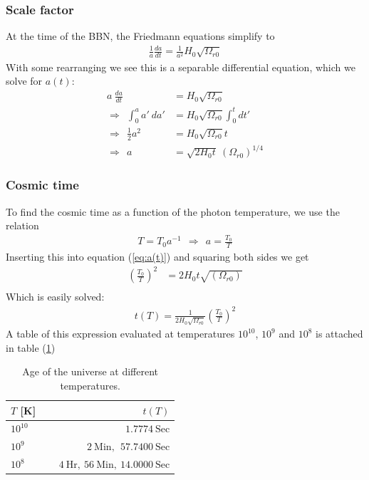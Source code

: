 \documentclass[reprint,english,notitlepage]{revtex4-1}  %
\numberwithin{equation}{section}
\begin{document}
\subsubsection{Scale factor}
At the time of the BBN, the Friedmann equations simplify to
\begin{align}
	\frac{1}{a} \frac{da}{dt} = \frac{1}{a^2}H_0 \sqrt{\Omega_{r0}}
\end{align}
With some rearranging we see this is a separable differential equation, which
we solve for $a(t)$:
\begin{align}
					 			 a\ \frac{da}{dt} &= H_0 \sqrt{\Omega_{r0}}\ \\
	\Rightarrow\ \ \int_0^a a'\ da' &= H_0 \sqrt{\Omega_{r0}} \int_0^t dt' \\
	\Rightarrow\ \   \frac{1}{2}a^2 &= H_0\sqrt{\Omega_{r0}}t \\
	\Rightarrow\ \ 	  				    a &= \sqrt{2 H_0 t}\  \left(\Omega_{r0}\right)^{1/4}
	\label{eq:a(t)}
\end{align}

\subsubsection{Cosmic time}
To find the cosmic time as a function of the photon temperature, we use the
relation
\begin{align}
	T = T_0 a^{-1} \ \ \Rightarrow \ \ a = \frac{T_0}{T}
\end{align}
Inserting this into equation (\ref{eq:a(t)}) and squaring both sides we get
\begin{align}
	\left(\frac{T_0}{T}\right)^2 &= 2 H_0 t \sqrt{(\Omega_{r0})} \\
\end{align}
Which is easily solved:
\begin{align}
	t(T) = \frac{1}{2 H_0 \sqrt{\Omega_{r0}}} \left(\frac{T_0}{T}\right)^2
\end{align}
A table of this expression evaluated at temperatures $10^{10}$, $10^9$ and $10^8$
is attached in table (\ref{tab:t(T)})

\begin{table}[h!]
	\begin{tabular}{lr}
	\hline
	      $T$ [K] &   $t(T)$ \\
	\hline
	\hline
	 $10^{10}$ 			& $\ \ \ \ \ \ 1.7774\ \mathrm{Sec}  $\\
	 $10^9$    			& $\ \ \ \ \ \ 2\ \mathrm{Min},\ \ 57.7400\ \mathrm{Sec}$ \\
	 $10^8$    			& $\ \ \ \ \ \ 4\ \mathrm{Hr},\  56\ \mathrm{Min},\ 14.0000\ \mathrm{Sec}$ \\
	\hline
	\hline
	\end{tabular}
	\caption{Age of the universe at different temperatures.}
	\label{tab:t(T)}
\end{table}
\end{document}
